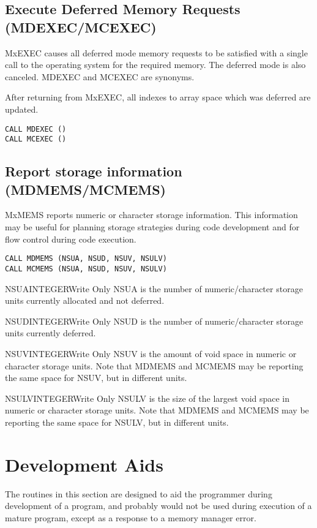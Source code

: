 \subsection{Execute Deferred Memory Requests (MDEXEC/MCEXEC)}
MxEXEC causes all deferred mode memory requests to be satisfied
with a single call to the operating system for the required memory. The
deferred mode is also canceled. MDEXEC and MCEXEC are synonyms.

After returning from MxEXEC, all indexes to array space which was
deferred are updated.
\begin{verbatim}
CALL MDEXEC ()
CALL MCEXEC ()
\end{verbatim}

\subsection{Report storage information (MDMEMS/MCMEMS)}
MxMEMS reports numeric or character storage information. This information
may be useful for planning storage strategies during code development
and for flow control during code execution.
\begin{verbatim}
CALL MDMEMS (NSUA, NSUD, NSUV, NSULV)
CALL MCMEMS (NSUA, NSUD, NSUV, NSULV)
\end{verbatim}

\begin{argy}{NSUA}{INTEGER}{Write Only}
NSUA is the number of numeric/character storage units currently allocated
and not deferred.
\end{argy}

\begin{argy}{NSUD}{INTEGER}{Write Only}
NSUD is the number of numeric/character storage units currently deferred.
\end{argy}

\begin{argy}{NSUV}{INTEGER}{Write Only}
NSUV is the amount of void space in numeric or character storage units. Note
that MDMEMS and MCMEMS may be reporting the same space for NSUV, but in
different units.
\end{argy}

\begin{argy}{NSULV}{INTEGER}{Write Only}
NSULV is the size of the largest void space in numeric or character storage
units. Note that MDMEMS and MCMEMS may be reporting the same space for
NSULV, but in different units.
\end{argy}

\section{Development Aids}\label{sec:mdev}
The routines in this section are designed to aid the programmer during
development of a program, and probably would not be used during execution of
a mature program, except as a response to a memory manager error.

